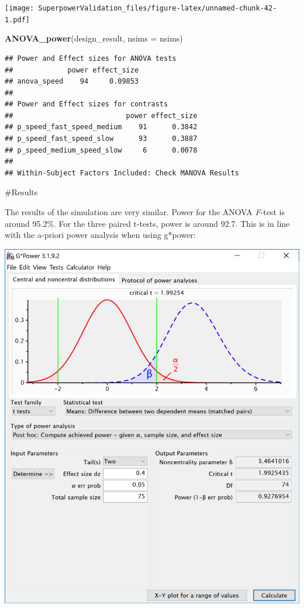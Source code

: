 \documentclass[]{book}
\newenvironment{Shaded}{\begin{snugshade}}{\end{snugshade}}
\newcommand{\DataTypeTok}[1]{\textcolor[rgb]{0.13,0.29,0.53}{#1}}
\newcommand{\KeywordTok}[1]{\textcolor[rgb]{0.13,0.29,0.53}{\textbf{#1}}}
\newcommand{\NormalTok}[1]{#1}
\begin{document}
\texttt{[image: SuperpowerValidation\_files/figure-latex/unnamed-chunk-42-1.pdf]}

\begin{Shaded}
\begin{Highlighting}[]
\KeywordTok{ANOVA_power}\NormalTok{(design_result, }\DataTypeTok{nsims =}\NormalTok{ nsims)}
\end{Highlighting}
\end{Shaded}

\begin{verbatim}
## Power and Effect sizes for ANOVA tests
##             power effect_size
## anova_speed    94     0.09853
## 
## Power and Effect sizes for contrasts
##                           power effect_size
## p_speed_fast_speed_medium    91      0.3842
## p_speed_fast_speed_slow      93      0.3887
## p_speed_medium_speed_slow     6      0.0078
## 
## Within-Subject Factors Included: Check MANOVA Results
\end{verbatim}

\#Results

The results of the simulation are very similar. Power for the ANOVA \emph{F}-test is around 95.2\%. For the three paired t-tests, power is around 92.7. This is in line with the a-priori power analysis when using g*power:

\includegraphics{screenshots/gpower_2.png}
\end{document}

